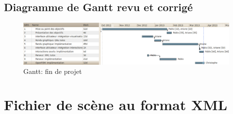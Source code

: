 \documentclass[a4paper, 11pt]{article}
\begin{document}
\subsection{Diagramme de Gantt revu et corrigé}
\begin{figure}[H]
    \includegraphics[width=\textwidth]{img/GanttFin.png}
    \caption{Gantt: fin de projet}
\end{figure}

\listoffigures 

\newpage
\appendix
\section{Fichier de scène au format XML}
\end{document}
